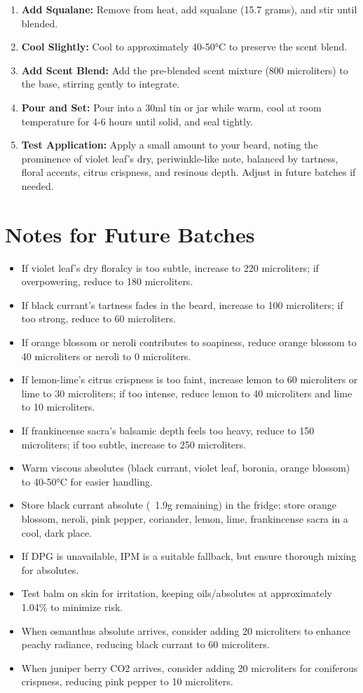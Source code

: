 \documentclass{article}
\begin{document}
\begin{enumerate}
  \item \textbf{Add Squalane:} Remove from heat, add squalane (15.7 grams), and stir until blended.
  \item \textbf{Cool Slightly:} Cool to approximately 40-50°C to preserve the scent blend.
  \item \textbf{Add Scent Blend:} Add the pre-blended scent mixture (800 microliters) to the base, stirring gently to integrate.
  \item \textbf{Pour and Set:} Pour into a 30ml tin or jar while warm, cool at room temperature for 4-6 hours until solid, and seal tightly.
  \item \textbf{Test Application:} Apply a small amount to your beard, noting the prominence of violet leaf’s dry, periwinkle-like note, balanced by tartness, floral accents, citrus crispness, and resinous depth. Adjust in future batches if needed.
\end{enumerate}

\section*{Notes for Future Batches}
\begin{itemize}
  \item If violet leaf’s dry floralcy is too subtle, increase to 220 microliters; if overpowering, reduce to 180 microliters.
  \item If black currant’s tartness fades in the beard, increase to 100 microliters; if too strong, reduce to 60 microliters.
  \item If orange blossom or neroli contributes to soapiness, reduce orange blossom to 40 microliters or neroli to 0 microliters.
  \item If lemon-lime’s citrus crispness is too faint, increase lemon to 60 microliters or lime to 30 microliters; if too intense, reduce lemon to 40 microliters and lime to 10 microliters.
  \item If frankincense sacra’s balsamic depth feels too heavy, reduce to 150 microliters; if too subtle, increase to 250 microliters.
  \item Warm viscous absolutes (black currant, violet leaf, boronia, orange blossom) to 40-50°C for easier handling.
  \item Store black currant absolute (~1.9g remaining) in the fridge; store orange blossom, neroli, pink pepper, coriander, lemon, lime, frankincense sacra in a cool, dark place.
  \item If DPG is unavailable, IPM is a suitable fallback, but ensure thorough mixing for absolutes.
  \item Test balm on skin for irritation, keeping oils/absolutes at approximately 1.04\% to minimize risk.
  \item When osmanthus absolute arrives, consider adding 20 microliters to enhance peachy radiance, reducing black currant to 60 microliters.
  \item When juniper berry CO2 arrives, consider adding 20 microliters for coniferous crispness, reducing pink pepper to 10 microliters.
\end{itemize}
\end{document}
